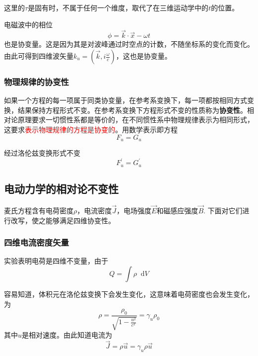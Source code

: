 \documentclass[UTF8]{ctexart}
\newcommand*{\dif}{\mathop{}\!\mathrm{d}}
\newcommand{\red}{\textcolor{red}}
\begin{document}
\noindent 这里的$\tau$是固有时，不属于任何一个维度，取代了在三维运动学中的$t$的位置。

    电磁波中的相位
    \begin{equation}
        \phi = \vec{k} \cdot \vec{x} - \omega t
    \end{equation}
\noindent 也是协变量。这是因为其是对波峰通过时空点的计数，不随坐标系的变化而变化。由此可得到四维波矢量$k_u = (\vec{k},i \frac{\omega}{c})$，这也是协变量。

    \subsubsection{物理规律的协变性}
    如果一个方程的每一项属于同类协变量，在参考系变换下，每一项都按相同方式变换，结果保持方程形式不变。在参考系变换下方程形式不变的性质称为\textbf{协变性}。相对论原理要求一切惯性系都是等价的，在不同惯性系中物理规律表示为相同形式，这要求\red{表示物理规律的方程是协变的}。用数学表示即方程
    \begin{equation}
        F_u = G_u 
    \end{equation}

\noindent 经过洛伦兹变换形式不变
\begin{equation}
    F_u^{\prime} = G_u^{\prime}
\end{equation}

    \subsection{电动力学的相对论不变性}
    麦氏方程含有电荷密度$\rho$，电流密度$\vec{J}$，电场强度$\vec{E}$和磁感应强度$\vec{B}$. 下面对它们进行改写，使之能够满足四维协变性。

    \subsubsection{四维电流密度矢量}
    实验表明电荷是四维不变量，由于
    \begin{equation}
        Q = \int \rho \dif V
    \end{equation}

\noindent 容易知道，体积元在洛伦兹变换下会发生变化，这意味着电荷密度也会发生变化，为
\begin{equation}
    \rho = \frac{\rho_0}{\sqrt{1-\frac{u^2}{c^2}}} = \gamma_u \rho_0
\end{equation}
\noindent 其中$u$是相对速度。由此知道电流为
\begin{equation}
    \vec{J} = \rho \vec{u} = \gamma_u \rho \vec{u}
\end{equation}
\end{document}
